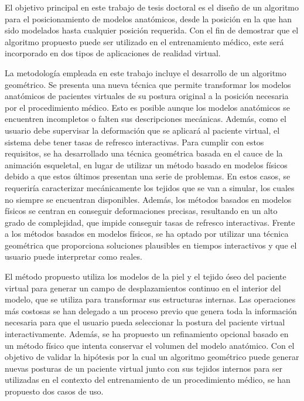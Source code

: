 El objetivo principal en este trabajo de tesis doctoral es el diseño de un algoritmo para el posicionamiento de modelos anatómicos, desde la posición en la que han sido modelados hasta cualquier posición requerida. Con el fin de demostrar que el algoritmo propuesto puede ser utilizado en el entrenamiento médico, este será incorporado en dos tipos de aplicaciones de realidad virtual.

La metodología empleada en este trabajo incluye el desarrollo de un algoritmo geométrico. Se presenta una nueva técnica que permite transformar los modelos anatómicos de pacientes virtuales de su postura original a la posición necesaria por el procedimiento médico. Esto es posible aunque los modelos anatómicos se encuentren incompletos o falten sus descripciones mecánicas. Además, como el usuario debe supervisar la deformación que se aplicará al paciente virtual, el sistema debe tener tasas de refresco interactivas. Para cumplir con estos requisitos, se ha desarrollado una técnica geométrica basada en el cauce de la animación esqueletal, en lugar de utilizar un método basado en modelos físicos debido a que estos últimos presentan una serie de problemas. En estos casos, se requeriría caracterizar mecánicamente los tejidos que se van a simular, los cuales no siempre se encuentran disponibles. Además, los métodos basados en modelos físicos se centran en conseguir deformaciones precisas, resultando en un alto grado de complejidad, que impide conseguir tasas de refresco interactivas. Frente a los métodos basados en modelos físicos, se ha optado por utilizar una técnica geométrica que proporciona soluciones plausibles en tiempos interactivos y que el usuario puede interpretar como reales.

El método propuesto utiliza los modelos de la piel y el tejido óseo del paciente virtual para generar un campo de desplazamientos continuo en el interior del modelo, que se utiliza para transformar sus estructuras internas. Las operaciones más costosas se han delegado a un proceso previo que genera toda la información necesaria para que el usuario pueda seleccionar la postura del paciente virtual interactivamente. Además, se ha propuesto un refinamiento opcional basado en un método físico que intenta conservar el volumen del modelo anatómico. Con el objetivo de validar la hipótesis por la cual un algoritmo geométrico puede generar nuevas posturas de un paciente virtual junto con sus tejidos internos para ser utilizadas en el contexto del entrenamiento de un procedimiento médico, se han propuesto dos casos de uso. 

